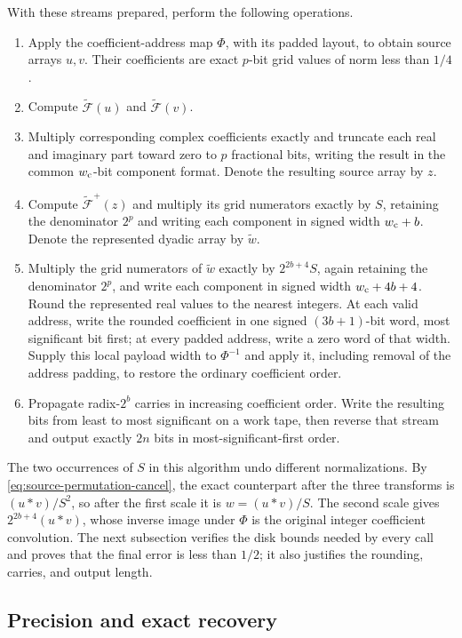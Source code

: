 With these streams prepared, perform the following operations.
\begin{enumerate}
\item Apply the coefficient-address map $\Phi$, with its padded layout, to obtain
source arrays $u,v$.  Their coefficients are exact $p$-bit grid
values of norm less than $1/4$.
\item Compute $\widetilde{\mathscr F}(u)$ and
$\widetilde{\mathscr F}(v)$.
\item Multiply corresponding complex coefficients exactly and truncate
each real and imaginary part toward zero to $p$ fractional bits, writing
the result in the common $w_{\rm c}$-bit component format.
Denote the resulting source array by $z$.
\item Compute $\widetilde{\mathscr F}^{+}(z)$ and multiply its grid
numerators exactly by $S$, retaining the denominator $2^p$ and writing
each component in signed width $w_{\rm c}+b$. Denote the represented
dyadic array by $\widetilde w$.
\item Multiply the grid numerators of $\widetilde w$ exactly by
$2^{2b+4}S$, again retaining the denominator $2^p$, and write each
component in signed width $w_{\rm c}+4b+4$. Round the represented real
values to the nearest integers. At each valid address, write the rounded
coefficient in one signed $(3b+1)$-bit word, most significant bit first;
at every padded address,
write a zero word of that width. Supply this local payload width to
$\Phi^{-1}$ and apply it, including removal of the address padding, to
restore the ordinary coefficient order.
\item Propagate radix-$2^b$ carries in increasing coefficient order.
Write the resulting bits from least to most significant on a work tape,
then reverse that stream and output exactly $2n$ bits in
most-significant-first order.
\end{enumerate}

The two occurrences of $S$ in this algorithm undo different
normalizations.  By \eqref{eq:source-permutation-cancel}, the exact
counterpart after the three transforms is $(u*v)/S^2$, so after the
first scale it is $w=(u*v)/S$.  The second scale gives
$2^{2b+4}(u*v)$, whose inverse image under $\Phi$ is the original
integer coefficient convolution.  The next subsection verifies the
disk bounds needed by every call and proves that the final error is
less than $1/2$; it also justifies the rounding, carries, and output
length.

\subsection{Precision and exact recovery}

